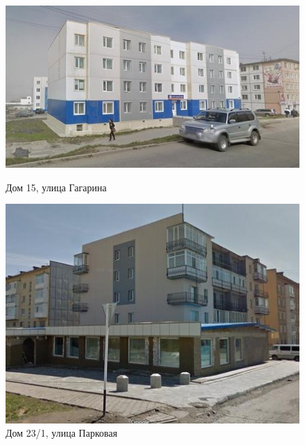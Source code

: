 \begin{figure}[H]
  \begin{center}
    \begin{minipage}[h]{0.545\linewidth}
        \includegraphics[width=1\textwidth]{authors/sydchak-fig-6.jpg}
        \caption{Дом 15, улица Гагарина }
        \label{fig:sydchak-fig-6}
    \end{minipage}
\hfill
    \begin{minipage}[h]{0.4\linewidth}
        \includegraphics[width=1\textwidth]{authors/sydchak-fig-7.jpg}
        \caption{Дом 23/1, улица Парковая }
        \label{fig:sydchak-fig-7}
    \end{minipage}


  \end{center}

\end{figure}
